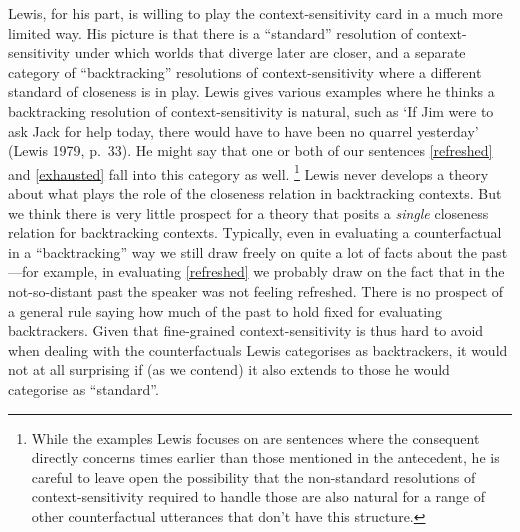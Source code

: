 \documentclass[If.tex]{subfiles}
\begin{document}
Lewis, for his part, is willing to play the context-sensitivity card in a much more limited way. His picture is that there is a “standard” resolution of context-sensitivity under which worlds that diverge later are closer, and a separate category of “backtracking” resolutions of context-sensitivity where a different standard of closeness is in play. Lewis gives various examples where he thinks a backtracking resolution of context-sensitivity is natural, such as ‘If Jim were to ask Jack for help today, there would have to have been no quarrel yesterday’ (Lewis 1979, p.~33). He might say that one or both of our sentences \ref{refreshed} and \ref{exhausted} fall into this category as well.%
\footnote{While the examples Lewis focuses on are sentences where the consequent directly concerns times earlier than those mentioned in the antecedent, he is careful to leave open the possibility that the non-standard resolutions of context-sensitivity required to handle those are also natural for a range of other counterfactual utterances that don't have this structure.} 
Lewis never develops a theory about what plays the role of the closeness relation in backtracking contexts. But we think there is very little prospect for a theory that posits a \emph{single} closeness relation for backtracking contexts. Typically, even in evaluating a counterfactual in a “backtracking” way we still draw freely on quite a lot of facts about the past---for example, in evaluating \ref{refreshed} we probably draw on the fact that in the not-so-distant past the speaker was not feeling refreshed. There is no prospect of a general rule saying how much of the past to hold fixed for evaluating backtrackers. Given that fine-grained context-sensitivity is thus hard to avoid when dealing with the counterfactuals Lewis categorises as backtrackers, it would not at all surprising if (as we contend) it also extends to those he would categorise as “standard”.  
\end{document}
